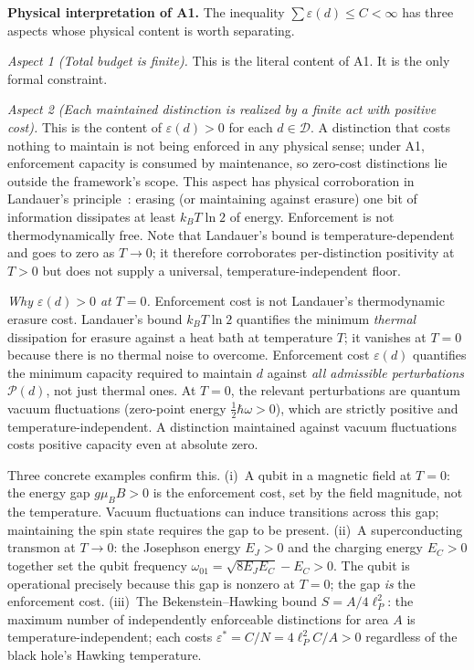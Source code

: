 \documentclass[11pt]{article}
\theoremstyle{remark}
\begin{document}
\smallskip\noindent\textbf{Physical interpretation of A1.}
The inequality $\sum \varepsilon(d) \le C < \infty$ has three aspects whose physical content is worth separating.

\textit{Aspect 1 (Total budget is finite).}  This is the literal content of A1.  It is the only formal constraint.

\textit{Aspect 2 (Each maintained distinction is realized by a finite act with positive cost).}  This is the content of $\varepsilon(d) > 0$ for each $d \in \mathcal{D}$.  A distinction that costs nothing to maintain is not being enforced in any physical sense; under A1, enforcement capacity is consumed by maintenance, so zero-cost distinctions lie outside the framework's scope.  This aspect has physical corroboration in Landauer's principle~\cite{Landauer1961}: erasing (or maintaining against erasure) one bit of information dissipates at least $k_B T \ln 2$ of energy.  Enforcement is not thermodynamically free.  Note that Landauer's bound is temperature-dependent and goes to zero as $T \to 0$; it therefore corroborates per-distinction positivity at $T > 0$ but does not supply a universal, temperature-independent floor.

\smallskip\noindent\textit{Why $\varepsilon(d) > 0$ at $T = 0$.}  Enforcement cost is not Landauer's thermodynamic erasure cost.  Landauer's bound $k_B T \ln 2$ quantifies the minimum \emph{thermal} dissipation for erasure against a heat bath at temperature $T$; it vanishes at $T = 0$ because there is no thermal noise to overcome.  Enforcement cost $\varepsilon(d)$ quantifies the minimum capacity required to maintain $d$ against \emph{all admissible perturbations} $\mathcal{P}(d)$, not just thermal ones.  At $T = 0$, the relevant perturbations are quantum vacuum fluctuations (zero-point energy $\tfrac{1}{2}\hbar\omega > 0$), which are strictly positive and temperature-independent.  A distinction maintained against vacuum fluctuations costs positive capacity even at absolute zero.

Three concrete examples confirm this.  (i)~A qubit in a magnetic field at $T = 0$: the energy gap $g\mu_B B > 0$ is the enforcement cost, set by the field magnitude, not the temperature.  Vacuum fluctuations can induce transitions across this gap; maintaining the spin state requires the gap to be present.  (ii)~A superconducting transmon at $T \to 0$: the Josephson energy $E_J > 0$ and the charging energy $E_C > 0$ together set the qubit frequency $\omega_{01} = \sqrt{8E_J E_C} - E_C > 0$.  The qubit is operational precisely because this gap is nonzero at $T = 0$; the gap \emph{is} the enforcement cost.  (iii)~The Bekenstein--Hawking bound $S = A/4\ell_P^2$: the maximum number of independently enforceable distinctions for area $A$ is temperature-independent; each costs $\varepsilon^* = C/N = 4\ell_P^2 C/A > 0$ regardless of the black hole's Hawking temperature.
\end{document}
